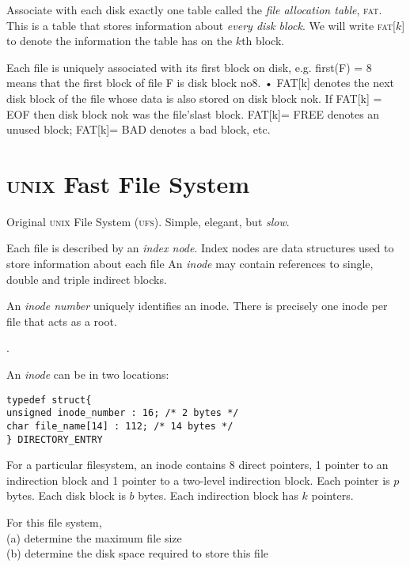Associate with each disk exactly one table 
called the \textit{file allocation table}, \textsc{fat}.
This is a table that stores information about \textit{every disk block}. 
We will write \textsc{fat}[$k$] to denote the information the table has on the $k$th block.

Each file is uniquely associated with its ﬁrst block
on disk, e.g. ﬁrst(F) = 8 means that the ﬁrst block
of ﬁle F is disk block no8.
• FAT[k] denotes the next disk block of the ﬁle whose
data is also stored on disk block nok.
If FAT[k] = EOF then disk block nok was the ﬁle’slast block.
FAT[k]= FREE denotes an unused block; FAT[k]=
BAD denotes a bad block, etc.


\section{\textsc{unix} Fast File System}

Original \textsc{unix} File System (\textsc{ufs}).
Simple, elegant, but \textit{slow}.


Each file is described by an \textit{index node}.
Index nodes are data structures used to store information about each file
An \textit{inode} may contain references to single, double 
and triple indirect blocks.

An \textit{inode number} uniquely identiﬁes an inode.
There is precisely one inode per ﬁle that acts as a root.

.

An \textit{inode} can be in two locations:




\begin{lstlisting}
typedef struct{
unsigned inode_number : 16; /* 2 bytes */
char file_name[14] : 112; /* 14 bytes */
} DIRECTORY_ENTRY
\end{lstlisting}




\begin{example}
For a particular filesystem, an inode contains 8 direct pointers, 
1 pointer to an indirection block and 1 pointer to a 
two-level indirection block. 
Each pointer is $p$ bytes. Each disk block is $b$ bytes.
Each indirection block has $k$ pointers.

For this file system, \\
(a) determine the maximum file size \\
(b) determine the disk space required to store this file
\end{example}

